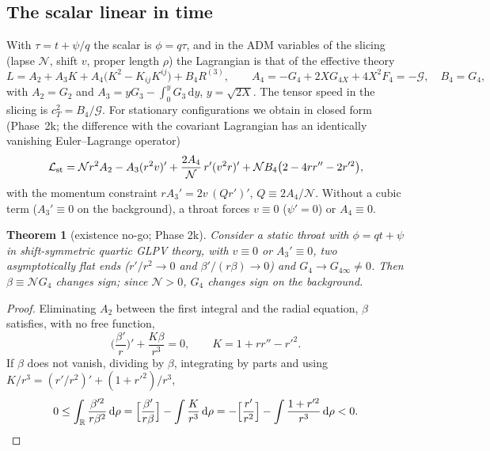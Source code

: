 \documentclass[11pt,a4paper]{article}
\newtheorem{theorem}{Theorem}
\theoremstyle{remark}
\newcommand{\G}{\mathcal G}
\newcommand{\Ncal}{\mathcal N}
\newcommand{\dd}{\mathrm d}
\begin{document}
\subsection{The scalar linear in time}

With $\tau=t+\psi/q$ the scalar is $\phi=q\tau$, and in the ADM variables of the slicing (lapse $\Ncal$, shift $v$, proper length $\rho$) the Lagrangian is that of the effective theory~\cite{GLPV}
\begin{equation}
L=A_2+A_3K+A_4\big(K^2-K_{ij}K^{ij}\big)+B_4R^{(3)},\qquad A_4=-G_4+2XG_{4X}+4X^2F_4=-\G,\quad B_4=G_4 ,
\end{equation}
with $A_2=G_2$ and $A_3=yG_3-\int_0^yG_3\,\dd y$, $y=\sqrt{2X}$. The tensor speed in the slicing is $c_T^2=B_4/\G$. For stationary configurations we obtain in closed form (Phase~2k; the difference with the covariant Lagrangian has an identically vanishing Euler--Lagrange operator)
\begin{equation}
\mathcal L_{\rm st}=\Ncal r^2A_2-A_3(r^2v)'+\frac{2A_4}{\Ncal}\,r'(v^2r)'+\Ncal B_4\big(2-4rr''-2r'^2\big),
\end{equation}
with the momentum constraint $rA_3'=2v\,(Qr')'$, $Q\equiv2A_4/\Ncal$. Without a cubic term ($A_3'\equiv0$ on the background), a throat forces $v\equiv0$ ($\psi'=0$) or $A_4\equiv0$.

\begin{theorem}[existence no-go; Phase 2k]\label{thm:beta}
Consider a static throat with $\phi=qt+\psi$ in shift-symmetric quartic GLPV theory, with $v\equiv0$ or $A_3'\equiv0$, two asymptotically flat ends ($r'/r^2\to0$ and $\beta'/(r\beta)\to0$) and $G_4\to G_{4\infty}\neq0$. Then $\beta\equiv\Ncal G_4$ changes sign; since $\Ncal>0$, $G_4$ changes sign on the background.
\end{theorem}

\begin{proof}
Eliminating $A_2$ between the first integral and the radial equation, $\beta$ satisfies, with no free function,
\begin{equation}
\Big(\frac{\beta'}{r}\Big)'+\frac{K\beta}{r^3}=0,\qquad K=1+rr''-r'^2 .
\label{eq:beta}
\end{equation}
If $\beta$ does not vanish, dividing by $\beta$, integrating by parts and using $K/r^3=(r'/r^2)'+(1+r'^2)/r^3$,
\begin{equation}
0\le\int_{\mathbb R}\frac{\beta'^2}{r\beta^2}\,\dd\rho=\Big[\frac{\beta'}{r\beta}\Big]-\int\frac{K}{r^3}\,\dd\rho=-\Big[\frac{r'}{r^2}\Big]-\int\frac{1+r'^2}{r^3}\,\dd\rho<0. \qedhere
\end{equation}
\end{proof}
\end{document}
